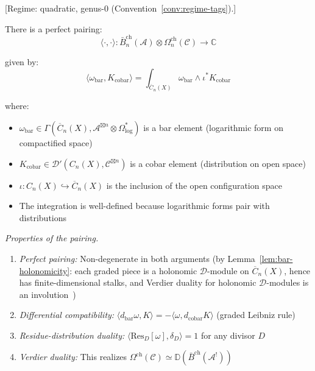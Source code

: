 \begin{theorem}\label{thm:bar-cobar-verdier}
\label{thm:verdier-bar-cobar}
\textup{[Regime: quadratic, genus-$0$
\textup{(}Convention~\textup{\ref{conv:regime-tags})}.]}

There is a perfect pairing:
\[\langle \cdot, \cdot \rangle: \bar{B}^{\text{ch}}_n(\mathcal{A}) \otimes 
\Omega^{\text{ch}}_n(\mathcal{C}) \to \mathbb{C}\]

given by:
\[\langle \omega_{\text{bar}}, K_{\text{cobar}} \rangle = \int_{\overline{C}_n(X)} 
\omega_{\text{bar}} \wedge \iota^* K_{\text{cobar}}\]

where:
\begin{itemize}
\item $\omega_{\text{bar}} \in \Gamma(\overline{C}_n(X), \mathcal{A}^{\boxtimes n} 
\otimes \Omega^*_{\log})$ is a bar element (logarithmic form on compactified space)
\item $K_{\text{cobar}} \in \mathcal{D}'(C_n(X), \mathcal{C}^{\boxtimes n})$ is 
a cobar element (distribution on open space)
\item $\iota: C_n(X) \hookrightarrow \overline{C}_n(X)$ is the inclusion of the 
open configuration space
\item The integration is well-defined because logarithmic forms pair with distributions
\end{itemize}

\emph{Properties of the pairing.}
\begin{enumerate}
\item \emph{Perfect pairing:} Non-degenerate in both arguments (by Lemma~\ref{lem:bar-holonomicity}: each graded piece is a holonomic $\mathcal{D}$-module on $\overline{C}_n(X)$, hence has finite-dimensional stalks, and Verdier duality for holonomic $\mathcal{D}$-modules is an involution~\cite{KashiwaraSchapira})
\item \emph{Differential compatibility:} $\langle d_{\text{bar}}\omega, K \rangle 
= -\langle \omega, d_{\text{cobar}}K \rangle$ (graded Leibniz rule)
\item \emph{Residue-distribution duality:} $\langle \text{Res}_{D}[\omega], 
\delta_D \rangle = 1$ for any divisor $D$
\item \emph{Verdier duality:} This realizes $\Omega^{\text{ch}}(\mathcal{C}) 
\simeq \mathbb{D}(\bar{B}^{\text{ch}}(\mathcal{A}^!))$
\end{enumerate}
\end{theorem}

